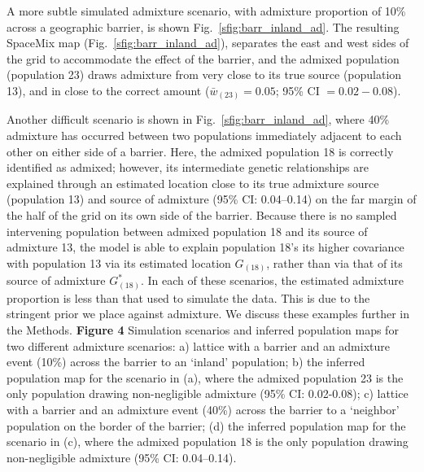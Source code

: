\documentclass[10pt,letterpaper]{article}
\newcommand{\kadmixsource}[1]{{$G^{*}_{#1}$}}
\begin{document}
A more subtle simulated admixture scenario, with admixture proportion of 10\% across a geographic barrier, 
is shown Fig.\ \ref{sfig:barr_inland_ad}.  
The resulting SpaceMix map (Fig.\ \ref{sfig:barr_inland_ad}), 
separates the east and west sides of the grid to accommodate the effect of the barrier,
and the admixed population (population 23) draws admixture from very close to its true source (population 13), 
and in close to the correct amount ($\bar{w}_{(23)} = 0.05$; 95\% CI $= 0.02-0.08$).

Another difficult scenario is shown in Fig.\ \ref{sfig:barr_inland_ad},
where 40\% admixture has occurred between two populations immediately adjacent to each other on either side of a barrier.  
Here, the admixed population 18 is correctly identified as admixed; 
however, its intermediate genetic relationships are explained through an estimated location close to its true admixture source (population 13)
and source of admixture (95\% CI: 0.04--0.14) on the far margin of the half of the grid on its own side of the barrier.
Because there is no sampled intervening population between admixed population 18 and its source of admixture 13, 
the model is able to explain population 18's its higher covariance with population 13 via its estimated location $G_{(18)}$, 
rather than via that of its source of admixture \kadmixsource{(18)}.  
In each of these scenarios, the estimated admixture proportion is less than that used to simulate the data.  This is due to the stringent prior we place against admixture.  We discuss these examples further in the Methods.
%
\newline\newline
{\bf{Figure 4}}    Simulation scenarios and inferred population maps for two different admixture scenarios: a) lattice with a barrier and an admixture event (10\%) across the barrier to an `inland' population; b) the inferred population map for the scenario in (a), where the admixed population 23 is the only population drawing non-negligible admixture (95\% CI: 0.02-0.08); c) lattice with a barrier and an admixture event (40\%) across the barrier to a `neighbor' population on the border of the barrier; (d) the inferred population map for the scenario in (c), where the admixed population 18 is the only population drawing non-negligible admixture (95\% CI: 0.04--0.14).
\newline\newline
\end{document}
